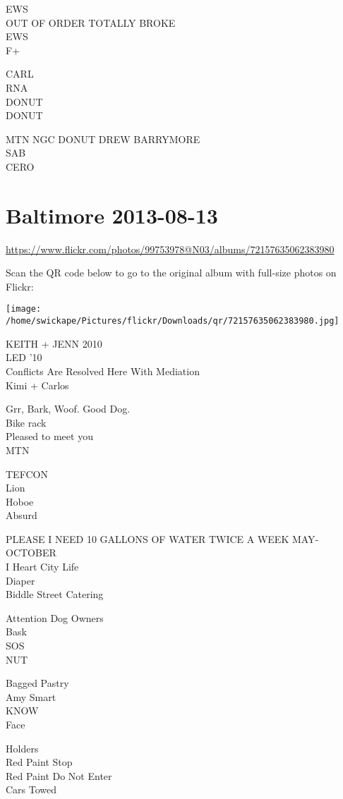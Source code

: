 \documentclass[10pt,letterpaper]{article}
\begin{document}
EWS\\
OUT OF ORDER TOTALLY BROKE\\
EWS\\
F+

CARL\\
RNA\\
DONUT\\
DONUT

MTN NGC DONUT DREW BARRYMORE\\
SAB\\
CERO


\section*{Baltimore 2013-08-13}

\url{https://www.flickr.com/photos/99753978@N03/albums/72157635062383980}

Scan the QR code below to go to the original album with full-size photos on Flickr:

\texttt{[image: /home/swickape/Pictures/flickr/Downloads/qr/72157635062383980.jpg]}


KEITH + JENN 2010\\
LED '10\\
Conflicts Are Resolved Here With Mediation\\
Kimi + Carlos

Grr, Bark, Woof.  Good Dog.\\
Bike rack\\
Pleased to meet you\\
MTN

TEFCON\\
Lion\\
Hoboe\\
Absurd

PLEASE I NEED 10 GALLONS OF WATER TWICE A WEEK MAY{-}OCTOBER\\
I Heart City Life\\
Diaper\\
Biddle Street Catering

Attention Dog Owners\\
Bask\\
SOS\\
NUT

Bagged Pastry\\
Amy Smart\\
KNOW\\
Face

Holders\\
Red Paint Stop\\
Red Paint Do Not Enter\\
Cars Towed
\end{document}
